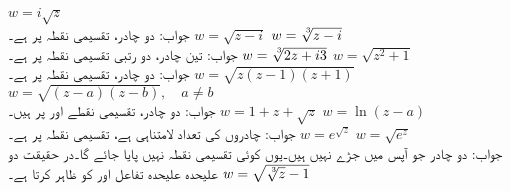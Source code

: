 \quad
$w=i\sqrt{z}$\\
جواب:\quad 
دو چادر، تقسیمی نقطہ  پر ہے۔
\quad
$w=\sqrt{z-i}$
\quad
$w=\sqrt[\leftroot{-2}\uproot{2}3]{z-i}$\\
جواب:\quad
تین چادر، دو رتبی  تقسیمی نقطہ  پر ہے۔
\quad
$w=\sqrt[\leftroot{-2}\uproot{2}3]{2z+i3}$
\quad
$w=\sqrt{z^2+1}$\\
جواب:\quad
دو چادر، تقسیمی نقطہ  پر ہے۔
\quad
$w=\sqrt{z(z-1)(z+1)}$
\quad
$w=\sqrt{(z-a)(z-b)},\quad a\ne b$\\
جواب:\quad
دو چادر، تقسیمی نقطے  اور   پر ہیں۔
\quad
$w=1+z+\sqrt{z}$
\quad
$w=\ln(z-a)$\\
جواب:\quad
چادروں کی تعداد لامتناہی ہے، تقسیمی نقطہ  پر ہے۔
\quad
$w=e^{\sqrt{z}}$
\quad
$w=\sqrt{e^z}$\\
جواب:\quad
دو چادر جو آپس میں جڑے نہیں ہیں۔یوں کوئی تقسیمی نقطہ نہیں پایا جائے گا۔در حقیقت  دو علیحدہ علیحدہ تفاعل  اور
  کو ظاہر کرتا ہے۔
\quad
$w=\sqrt{\sqrt[\leftroot{-2}\uproot{2}3]{z}-1}$
